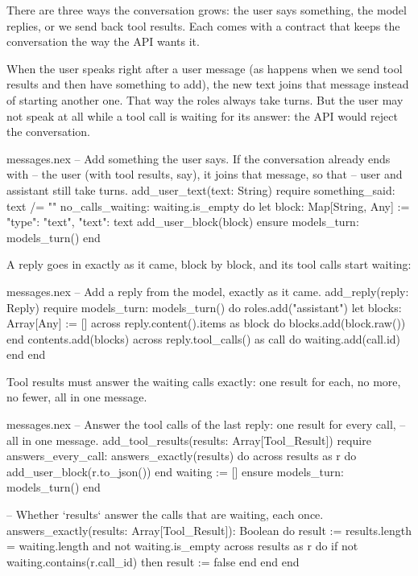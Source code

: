 There are three ways the conversation grows: the user says something, the
model replies, or we send back tool results. Each comes with a contract
that keeps the conversation the way the API wants it.

When the user speaks right after a user message (as happens when we send
tool results and then have something to add), the new text joins that
message instead of starting another one. That way the roles always take
turns. But the user may not speak at all while a tool call is waiting for
its answer: the API would reject the conversation.

\begin{continued}{messages.nex}
  -- Add something the user says. If the conversation already ends with
  -- the user (with tool results, say), it joins that message, so that
  -- user and assistant still take turns.
  add_user_text(text: String)
  require
    something_said: text /= ""
    no_calls_waiting: waiting.is_empty
  do
    let block: Map[String, Any] := {"type": "text", "text": text}
    add_user_block(block)
  ensure
    models_turn: models_turn()
  end
\end{continued}

A reply goes in exactly as it came, block by block, and its tool calls
start waiting:

\begin{continued}{messages.nex}
  -- Add a reply from the model, exactly as it came.
  add_reply(reply: Reply)
  require
    models_turn: models_turn()
  do
    roles.add("assistant")
    let blocks: Array[Any] := []
    across reply.content().items as block do
      blocks.add(block.raw())
    end
    contents.add(blocks)
    across reply.tool_calls() as call do
      waiting.add(call.id)
    end
  end
\end{continued}

Tool results must answer the waiting calls exactly: one result for each,
no more, no fewer, all in one message.

\begin{continued}{messages.nex}
  -- Answer the tool calls of the last reply: one result for every call,
  -- all in one message.
  add_tool_results(results: Array[Tool_Result])
  require
    answers_every_call: answers_exactly(results)
  do
    across results as r do
      add_user_block(r.to_json())
    end
    waiting := []
  ensure
    models_turn: models_turn()
  end

  -- Whether `results` answer the calls that are waiting, each once.
  answers_exactly(results: Array[Tool_Result]): Boolean do
    result := results.length = waiting.length and not waiting.is_empty
    across results as r do
      if not waiting.contains(r.call_id) then
        result := false
      end
    end
  end
\end{continued}

